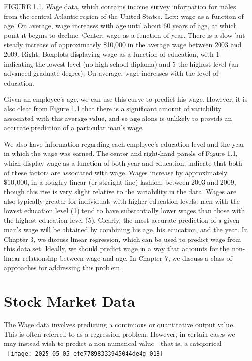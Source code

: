 \documentclass[10pt]{article}
\begin{document}
FIGURE 1.1. Wage data, which contains income survey information for males from the central Atlantic region of the United States. Left: wage as a function of age. On average, wage increases with age until about 60 years of age, at which point it begins to decline. Center: wage as a function of year. There is a slow but steady increase of approximately \$10,000 in the average wage between 2003 and 2009. Right: Boxplots displaying wage as a function of education, with 1 indicating the lowest level (no high school diploma) and 5 the highest level (an advanced graduate degree). On average, wage increases with the level of education.

Given an employee's age, we can use this curve to predict his wage. However, it is also clear from Figure 1.1 that there is a significant amount of variability associated with this average value, and so age alone is unlikely to provide an accurate prediction of a particular man's wage.

We also have information regarding each employee's education level and the year in which the wage was earned. The center and right-hand panels of Figure 1.1, which display wage as a function of both year and education, indicate that both of these factors are associated with wage. Wages increase by approximately $\$ 10,000$, in a roughly linear (or straight-line) fashion, between 2003 and 2009, though this rise is very slight relative to the variability in the data. Wages are also typically greater for individuals with higher education levels: men with the lowest education level (1) tend to have substantially lower wages than those with the highest education level (5). Clearly, the most accurate prediction of a given man's wage will be obtained by combining his age, his education, and the year. In Chapter 3, we discuss linear regression, which can be used to predict wage from this data set. Ideally, we should predict wage in a way that accounts for the non-linear relationship between wage and age. In Chapter 7, we discuss a class of approaches for addressing this problem.

\section*{Stock Market Data}
The Wage data involves predicting a continuous or quantitative output value. This is often referred to as a regression problem. However, in certain cases we may instead wish to predict a non-numerical value - that is, a categorical\
\
\texttt{[image: 2025\_05\_05\_efe77898333945044de4g-018]}
\end{document}
